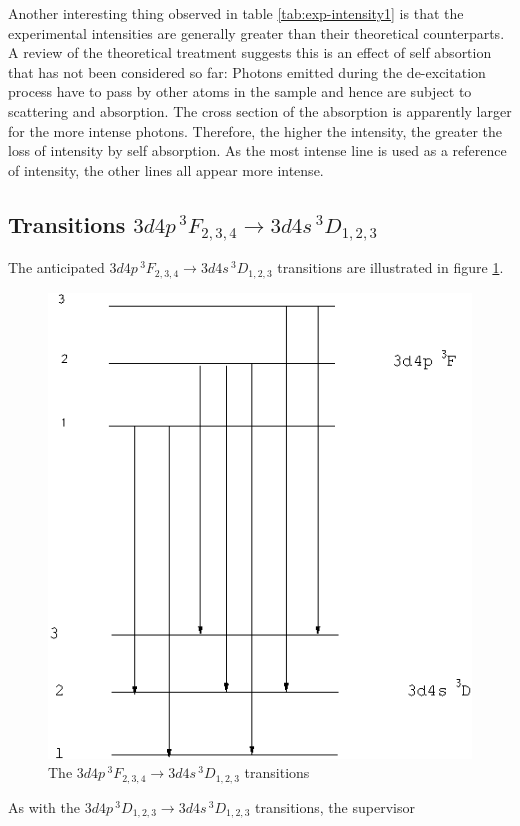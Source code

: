 \documentclass[a4paper]{article}
\begin{document}
Another interesting thing observed in table \ref{tab:exp-intensity1}
is that the experimental intensities are generally greater than their
theoretical counterparts. A review of the theoretical treatment
suggests this is an effect of self absortion that has not been
considered so far: Photons emitted during the de-excitation process
have to pass by other atoms in the sample and hence are subject to
scattering and absorption. The cross section of the absorption is
apparently larger for the more intense photons. Therefore, the higher
the intensity, the greater the loss of intensity by self
absorption. As the most intense line is used as a reference of
intensity, the other lines all appear more intense.

\subsection{Transitions $3d4p\,^3F_{2,3,4} \to 3d4s\,^3D_{1,2,3}$}
The anticipated $3d4p\,^3F_{2,3,4} \to 3d4s\,^3D_{1,2,3}$ transitions
are illustrated in figure \ref{fig:transition2}.
\begin{figure}[htb!]
\centering
\includegraphics[scale=0.35]{transition2}
\caption{The $3d4p\,^3F_{2,3,4} \to 3d4s\,^3D_{1,2,3}$ transitions}
\label{fig:transition2}
\end{figure}
As with the $3d4p\,^3D_{1,2,3} \to 3d4s\,^3D_{1,2,3}$ transitions, the supervisor
\end{document}
